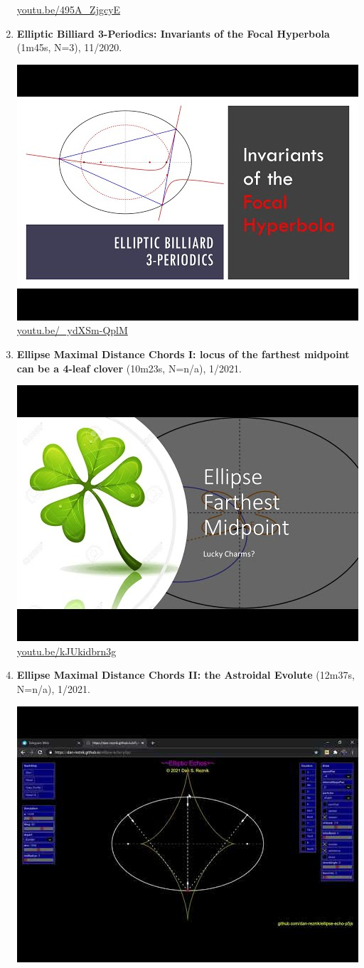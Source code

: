 \documentclass[12pt]{amsart}
\begin{document}
\begin{enumerate}[resume]
\begin{center}
\href{https://youtu.be/495A_ZjgcyE}{\url{youtu.be/495A\_ZjgcyE}}\end{center}
% 
\item \textbf{Elliptic Billiard 3-Periodics: Invariants of the Focal Hyperbola} (1m45s, N=3), 11/2020. 
\begin{center}\includegraphics[width=.5\textwidth]{pics/_ydXSm-QplM.jpg} \\ 
\href{https://youtu.be/_ydXSm-QplM}{\url{youtu.be/\_ydXSm-QplM}}\end{center}
% 
\item \textbf{Ellipse Maximal Distance Chords I: locus of the farthest midpoint can be a 4-leaf clover} (10m23s, N=n/a), 1/2021. 
\begin{center}\includegraphics[width=.5\textwidth]{pics/kJUkidbrn3g.jpg} \\ 
\href{https://youtu.be/kJUkidbrn3g}{\url{youtu.be/kJUkidbrn3g}}\end{center}
% 
\item \textbf{Ellipse Maximal Distance Chords II: the Astroidal Evolute} (12m37s, N=n/a), 1/2021. 
\begin{center}\includegraphics[width=.5\textwidth]{pics/YvoyN46biq8.jpg} \\ 

\end{center}
\end{enumerate}
\end{document}
